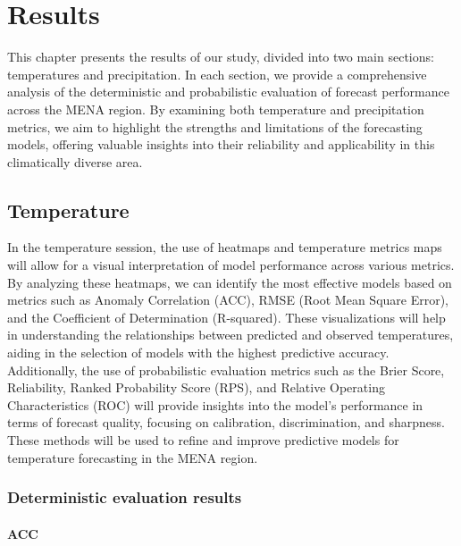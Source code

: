 \chapter{Results}
This chapter presents the results of our study, divided into two main sections: temperatures and precipitation. In each section, we provide a comprehensive analysis of the deterministic and probabilistic evaluation of forecast performance across the MENA region. By examining both temperature and precipitation metrics, we aim to highlight the strengths and limitations of the forecasting models, offering valuable insights into their reliability and applicability in this climatically diverse area.
\section{Temperature}

In the temperature session, the use of heatmaps and temperature metrics maps will allow for a visual interpretation of model performance across various metrics. By analyzing these heatmaps, we can identify the most effective models based on metrics such as Anomaly Correlation (ACC), RMSE (Root Mean Square Error), and the Coefficient of Determination (R-squared). These visualizations will help in understanding the relationships between predicted and observed temperatures, aiding in the selection of models with the highest predictive accuracy. Additionally, the use of probabilistic evaluation metrics such as the Brier Score, Reliability, Ranked Probability Score (RPS), and Relative Operating Characteristics (ROC) will provide insights into the model's performance in terms of forecast quality, focusing on calibration, discrimination, and sharpness. These methods will be used to refine and improve predictive models for temperature forecasting in the MENA region.
\subsection{Deterministic evaluation results}

\subsubsection{ACC}

